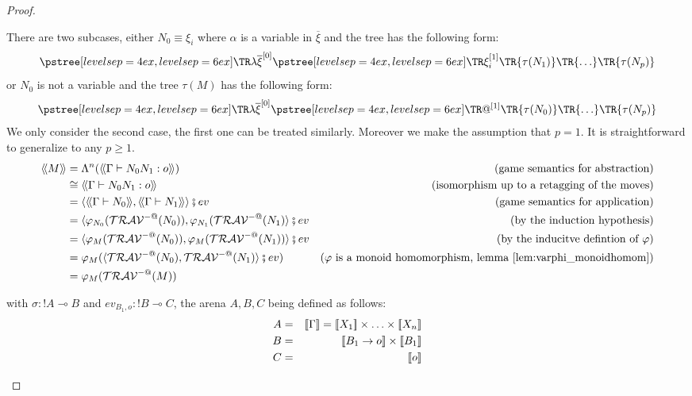 \begin{proof}
\begin{itemize}
    There are two subcases, either $N_0 \equiv \xi_i$ where $\alpha$ is a variable in $\overline{\xi}$ and the tree has the following form:
    $$ \tree[levelsep=6ex]{\lambda \overline{\xi}^{[0]}}
        { \tree[levelsep=6ex]{\xi_i^{[1]}}
            {   \TR{\tau(N_1)} \TR{\ldots} \TR{\tau(N_p)}}}
    $$
    or $N_0$ is not a variable and the tree $\tau(M)$ has the following form:
    $$ \tree[levelsep=6ex]{\lambda \overline{\xi}^{[0]}}
        { \tree[levelsep=6ex]{@^{[1]}}
            {   \TR{\tau(N_0)} \TR{\ldots} \TR{\tau(N_p)}}}
    $$
    We only consider the second case, the first one can be treated
    similarly. Moreover we make the assumption that $p=1$. It is
    straightforward to generalize to any $p\geq1$.
\begin{align*}
  \intersem{M}
    &=  \Lambda^n( \intersem{\Gamma \vdash N_0 N_1 : o} )
           & \mbox{(game semantics for abstraction)}\\
    &\cong  \intersem{\Gamma \vdash N_0 N_1 : o}
           & \mbox{(isomorphism up to a retagging of the moves)}\\
    &=  \langle \intersem{\Gamma \vdash N_0}, \intersem{\Gamma \vdash N_1} \rangle \fatsemi ev
           & \mbox{(game semantics for application)}\\
    &=  \langle \varphi_{N_0} (\travset^{-@}(N_0)), \varphi_{N_1}(\travset^{-@}(N_1) \rangle \fatsemi ev
           & \mbox{(by the induction hypothesis)}\\
    &=  \langle \varphi_{M} (\travset^{-@}(N_0)), \varphi_{M}(\travset^{-@}(N_1)) \rangle \fatsemi ev
           & \mbox{(by the inducitve defintion of $\varphi$)}\\
    &=  \varphi_{M}( \langle \travset^{-@}(N_0), \travset^{-@}(N_1) \rangle \fatsemi
    ev )
           & \mbox{($\varphi$ is a monoid homomorphism, lemma \ref{lem:varphi_monoidhomom})}\\
    &=  \varphi_{M}( \travset^{-@}(M) )
           &
\end{align*}

    with $\sigma : !A \multimap B$ and $ev_{B_1,o} : !B \multimap C$, the arena $A,B,C$ being defined as follows:
    \begin{eqnarray*}
        A &=& \sem{\Gamma} = \sem{X_1} \times \ldots \times \sem{X_n}\\
        B &=& \sem{B_1 \rightarrow o} \times \sem{B_1} \\
        C &=& \sem{o}
    \end{eqnarray*}





\end{itemize}
\end{proof}
